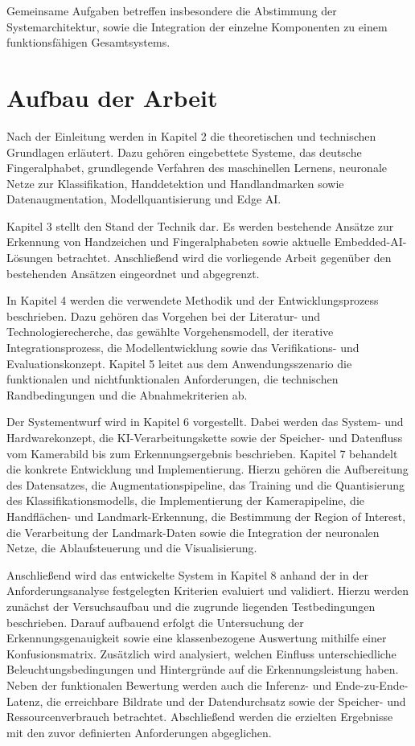 Gemeinsame Aufgaben betreffen insbesondere die Abstimmung der Systemarchitektur, sowie die Integration der einzelne Komponenten zu einem funktionsfähigen Gesamtsystems.

\section{Aufbau der Arbeit}

Nach der Einleitung werden in Kapitel 2 die theoretischen und technischen Grundlagen erläutert. Dazu gehören eingebettete Systeme, das deutsche Fingeralphabet, grundlegende Verfahren des maschinellen Lernens, neuronale Netze zur Klassifikation, Handdetektion und Handlandmarken sowie Datenaugmentation, Modellquantisierung und Edge AI.

Kapitel 3 stellt den Stand der Technik dar. Es werden bestehende Ansätze zur Erkennung von Handzeichen und Fingeralphabeten sowie aktuelle Embedded-AI-Lösungen betrachtet. Anschließend wird die vorliegende Arbeit gegenüber den bestehenden Ansätzen eingeordnet und abgegrenzt.

In Kapitel 4 werden die verwendete Methodik und der Entwicklungsprozess beschrieben. Dazu gehören das Vorgehen bei der Literatur- und Technologierecherche, das gewählte Vorgehensmodell, der iterative Integrationsprozess, die Modellentwicklung sowie das Verifikations- und Evaluationskonzept. Kapitel 5 leitet aus dem Anwendungsszenario die funktionalen und nichtfunktionalen Anforderungen, die technischen Randbedingungen und die Abnahmekriterien ab.

Der Systementwurf wird in Kapitel 6 vorgestellt. Dabei werden das System- und Hardwarekonzept, die KI-Verarbeitungskette sowie der Speicher- und Datenfluss vom Kamerabild bis zum Erkennungsergebnis beschrieben. Kapitel 7 behandelt die konkrete Entwicklung und Implementierung. Hierzu gehören die Aufbereitung des Datensatzes, die Augmentationspipeline, das Training und die Quantisierung des Klassifikationsmodells, die Implementierung der Kamerapipeline, die Handflächen- und Landmark-Erkennung, die Bestimmung der Region of Interest, die Verarbeitung der Landmark-Daten sowie die Integration der neuronalen Netze, die Ablaufsteuerung und die Visualisierung.

Anschließend wird das entwickelte System in Kapitel 8 anhand der in der Anforderungsanalyse festgelegten Kriterien evaluiert und validiert. Hierzu werden zunächst der Versuchsaufbau und die zugrunde liegenden Testbedingungen beschrieben. Darauf aufbauend erfolgt die Untersuchung der Erkennungsgenauigkeit sowie eine klassenbezogene Auswertung mithilfe einer Konfusionsmatrix. Zusätzlich wird analysiert, welchen Einfluss unterschiedliche Beleuchtungsbedingungen und Hintergründe auf die Erkennungsleistung haben. Neben der funktionalen Bewertung werden auch die Inferenz- und Ende-zu-Ende-Latenz, die erreichbare Bildrate und der Datendurchsatz sowie der Speicher- und Ressourcenverbrauch betrachtet. Abschließend werden die erzielten Ergebnisse mit den zuvor definierten Anforderungen abgeglichen.

